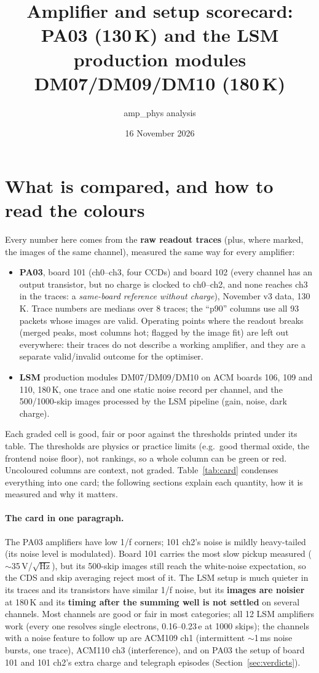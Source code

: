 \documentclass[10pt]{article}
\title{Amplifier and setup scorecard:\\PA03 (130\,K) and the LSM production modules DM07/DM09/DM10 (180\,K)}
\author{amp\_phys analysis}
\date{16 November 2026}
\begin{document}
\maketitle

\section*{What is compared, and how to read the colours}
Every number here comes from the \textbf{raw readout traces} (plus, where marked, the images of the same channel), measured
the same way for every amplifier:
\begin{itemize}[nosep]
\item \textbf{PA03}, board 101 (ch0--ch3, four CCDs) and board 102 (every channel has an output transistor, but no charge is clocked to ch0--ch2, and none reaches ch3 in
  the traces: a \emph{same-board reference without charge}), November v3 data, 130\,K. Trace numbers are medians over 8 traces; the
  ``p90'' columns use all 93 packets whose images are valid. Operating points where the readout breaks (merged peaks, most columns hot; flagged by the image fit) are left out everywhere: their traces do not describe a working amplifier, and they are a separate valid/invalid outcome for the optimiser.
\item \textbf{LSM} production modules DM07/DM09/DM10 on ACM boards 106, 109 and 110, 180\,K, one trace and one static
  noise record per channel, and the 500/1000-skip images processed by the LSM pipeline (gain, noise, dark charge).
\end{itemize}
Each graded cell is \colorbox{good}{good}, \colorbox{fair}{fair} or \colorbox{poor}{poor} against the thresholds printed
under its table. The thresholds are physics or practice limits (e.g.\ good thermal oxide, the frontend noise floor), not
rankings, so a whole column can be green or red. Uncoloured columns are context, not graded.
Table~\ref{tab:card} condenses everything into one card; the following sections explain each quantity, how it is
measured and why it matters.



\paragraph{The card in one paragraph.} The PA03 amplifiers have low 1/f corners; 101 ch2's noise is mildly heavy-tailed (its noise level is modulated).
Board 101 carries the most slow pickup measured ($\sim$35\,\textmu V/$\sqrt{\text{Hz}}$), but its 500-skip images still reach
the white-noise expectation, so the CDS and skip averaging reject most of it. The LSM setup is much quieter in its
traces and its transistors have similar 1/f noise, but its
\textbf{images are noisier} at 180\,K and its \textbf{timing after the summing well is not settled} on several channels.
Most channels are good or fair in most categories; all 12 LSM amplifiers work (every one resolves single electrons, 0.16--0.23\,e at 1000 skips); the channels with a
noise feature to follow up are ACM109 ch1 (intermittent $\sim$1\,ms noise bursts, one trace), ACM110 ch3 (interference), and on PA03 the setup of board 101 and 101 ch2's extra charge and telegraph
episodes (Section~\ref{sec:verdicts}).
\end{document}
